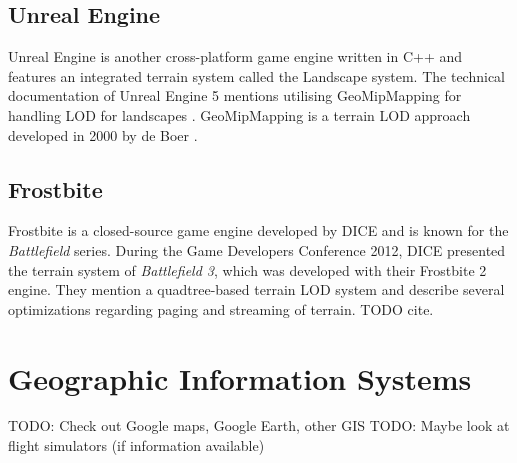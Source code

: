 \subsection{Unreal Engine}
Unreal Engine is another cross-platform game engine written in C++ and features
an integrated terrain system called the Landscape system.
The technical documentation of Unreal Engine 5 mentions utilising GeoMipMapping for 
handling LOD for landscapes \cite{unrealengine5doc}. GeoMipMapping is a terrain LOD approach developed 
in 2000 by de Boer \cite{geomipmapping}. %

\subsection{Frostbite}
Frostbite is a closed-source game engine developed by DICE and is known for the \textit{Battlefield} series.
During the Game Developers Conference 2012, DICE presented the terrain system of \textit{Battlefield 3}, which was developed with their Frostbite 2 engine.
They mention a quadtree-based terrain LOD system and describe several optimizations regarding paging and streaming of terrain.
TODO cite.

\section{Geographic Information Systems}
TODO: Check out Google maps, Google Earth, other GIS
TODO: Maybe look at flight simulators (if information available)
